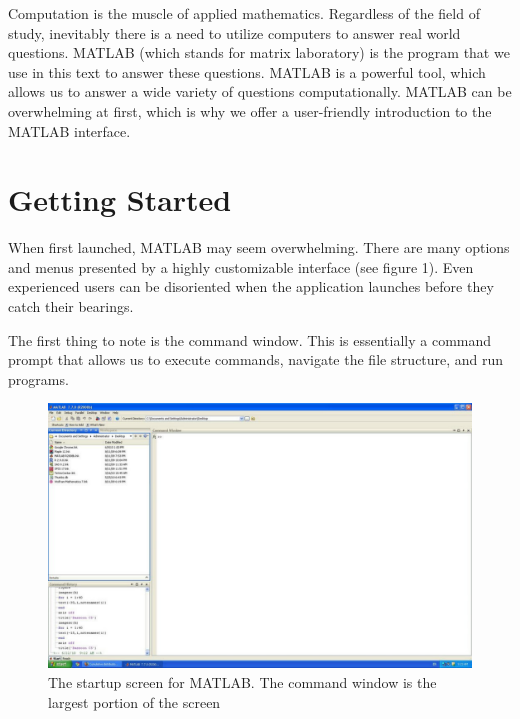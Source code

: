 \setcounter{chapter}{-1}


Computation is the muscle of applied mathematics. Regardless of the field of study, inevitably there is a need to utilize computers to answer real world questions. MATLAB (which stands for matrix laboratory) is the program that we use in this text to answer these questions. MATLAB is a powerful tool, which allows us to answer a wide variety of questions computationally. MATLAB can be overwhelming at first, which is why we offer a user-friendly introduction to the MATLAB interface. %

\section*{Getting Started} When first launched, MATLAB may seem overwhelming.  There are many options and menus presented by a highly customizable interface (see figure 1).  Even experienced users can be disoriented when the application launches before they catch their bearings.

The first thing to note is the command window.  This is essentially a command prompt that allows us to execute commands, navigate the file structure, and run programs.  

\begin{figure}[h!]
\begin{center}
	\includegraphics[scale=0.3]{./Figures/homeScreen}
	\caption{The startup screen for MATLAB. The command window is the largest portion of the screen}
\end{center}
\end{figure}


